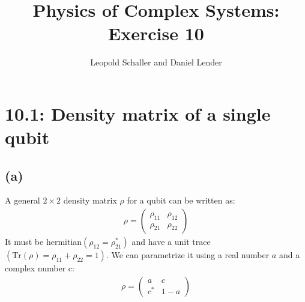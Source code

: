 \documentclass{article}
\title{Physics of Complex Systems: Exercise 10}
\author{Leopold Schaller and Daniel Lender}
\begin{document}
\maketitle

\section*{10.1: Density matrix of a single qubit}
\subsection*{(a)}
A general $2×2$ density matrix $\rho$ for a qubit can be written as:
\begin{align*}
    \rho=
    \begin{pmatrix}
      \rho_{11}&\rho_{12}\\ 
      \rho_{21}&\rho_{22}
    \end{pmatrix}
\end{align*}
It must be hermitian$(\rho_{12}=\rho_{21}^*)$ and have a unit trace $(\text{Tr}(ρ)=\rho_{11}+\rho_{22}=1)$. We can parametrize it using a real number $a$ and a complex number c:
\begin{align}
    \rho=
    \begin{pmatrix}
      a&c\\ 
      c^*&1-a
    \end{pmatrix}
\end{align}
\end{document}

